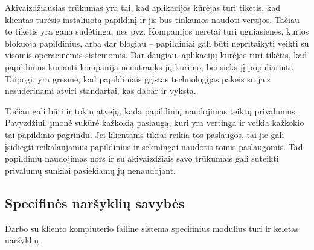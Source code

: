 \documentclass[12pt,a4paper,titlepage]{article}
\begin{document}
Akivaizdžiausias trūkumas yra tai, kad aplikacijos kūrėjas turi tikėtis, kad klientas turėsis instaliuotą papildinį ir jis bus tinkamos naudoti versijos. Tačiau to tikėtis yra gana sudėtinga, nes pvz. Kompanijos neretai turi ugniasienes, kurios blokuoja papildinius, arba dar blogiau – papildiniai gali būti nepritaikyti veikti su visomis operacinėmis sistemomis. Dar daugiau, aplikacijų kūrėjas turi tikėtis, kad papildinius kurianti kompanija nenutrauks jų kūrimo, bei sieks jį populiarinti. Taipogi, yra grėsmė, kad papildiniais grįstas technologijas pakeis su jais nesuderinami atviri standartai, kas dabar ir vyksta.

Tačiau gali būti ir tokių atvejų, kada papildinių naudojimas teiktų privalumus. Pavyzdžiui, įmonė sukūrė kažkokią paslaugą, kuri yra vertinga ir veikia kažkokio tai papildinio pagrindu. Jei klientams tikrai reikia tos paslaugos, tai jie gali įsidiegti reikalaujamus papildinius ir sėkmingai naudotis tomis paslaugomis. Tad papildinių naudojimas nors ir su akivaizdžiais savo trūkumais gali suteikti privalumų sunkiai pasiekiamų jų nenaudojant.

\subsection{Specifinės naršyklių savybės}

Darbo su kliento kompiuterio failine sistema specifinius modulius turi ir keletas naršyklių. 
\end{document}
